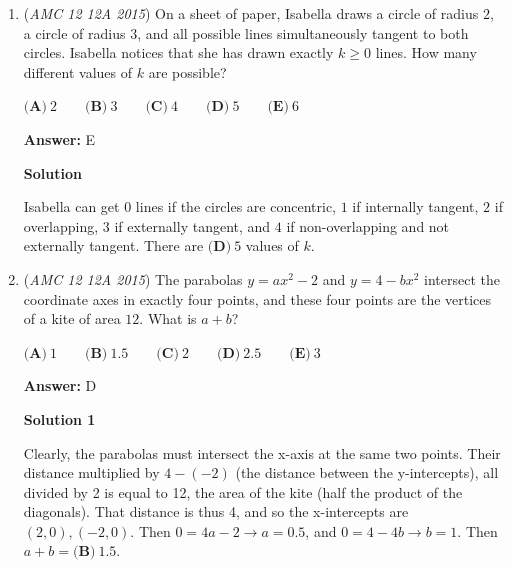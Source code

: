 \begin{enumerate}
 $x = 8$:

 $8 + y + 8y = 80$
$y = 8$ (Does not work because $x > y$)

 
$x = 10$:

 $10 + y + 10y = 80$
$y = 70/11$ (Does not work because $y$ is not an integer)

 
$x = 15$:

 $15 + y + 15y = 80$
$y = 65/16$ (Does not work because $y$ is not an integer)

 
$x = 18$:

 $18 + y + 18y = 80$
$y = 62/19$ (Does not work because $y$ is not an integer)

 
Thus $x = 26$, $\boxed{\textbf{(E)}\ 26}$.

 


	\item (\textit{AMC 12 12A 2015}) On a sheet of paper, Isabella draws a circle of radius $2$, a circle of radius $3$, and all possible lines simultaneously tangent to both circles. Isabella notices that she has drawn exactly $k \ge 0$ lines. How many different values of $k$ are possible?


 $\textbf{(A)}\ 2 \qquad\textbf{(B)}\ 3 \qquad\textbf{(C)}\ 4 \qquad\textbf{(D)}\ 5\qquad\textbf{(E)}\ 6$

 \textbf{Answer: }E



\textbf{Solution}

Isabella can get $0$ lines if the circles are concentric, $1$ if internally tangent, $2$ if overlapping, $3$ if externally tangent, and $4$ if non-overlapping and not externally tangent. There are $\boxed{\textbf{(D)}\ 5}$ values of $k$.

 


	\item (\textit{AMC 12 12A 2015}) The parabolas $y=ax^2 - 2$ and $y=4 - bx^2$ intersect the coordinate axes in exactly four points, and these four points are the vertices of a kite of area $12$. What is $a+b$?


 $\textbf{(A)}\ 1\qquad\textbf{(B)}\ 1.5\qquad\textbf{(C)}\ 2\qquad\textbf{(D)}\ 2.5\qquad\textbf{(E)}\ 3$

 \textbf{Answer: }D



\textbf{Solution 1}

Clearly, the parabolas must intersect the x-axis at the same two points. Their distance multiplied by $4 - (-2)$ (the distance between the y-intercepts), all divided by 2 is equal to 12, the area of the kite (half the product of the diagonals). That distance is thus 4, and so the x-intercepts are $(2, 0), (-2, 0).$ Then $0 = 4a - 2 \rightarrow a = 0.5$, and $0 = 4 - 4b \rightarrow b = 1.$ Then $a + b = \boxed{\textbf{(B)}\ 1.5}$.


\end{enumerate}
